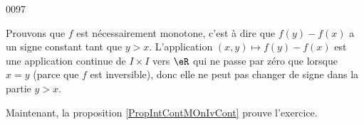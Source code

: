 
\begin{corrige}{0097}

Prouvons que $f$ est nécessairement monotone, c'est à dire que $f(y)-f(x)$ a un signe constant tant que $y>x$. L'application $(x,y)\mapsto f(y)-f(x)$ est une application continue de $I\times I$ vers $\eR$ qui ne passe par zéro que lorsque $x=y$ (parce que $f$ est inversible), donc elle ne peut pas changer de signe dans la partie $y>x$.

Maintenant, la proposition \ref{PropIntContMOnIvCont} prouve l'exercice.

\end{corrige}
